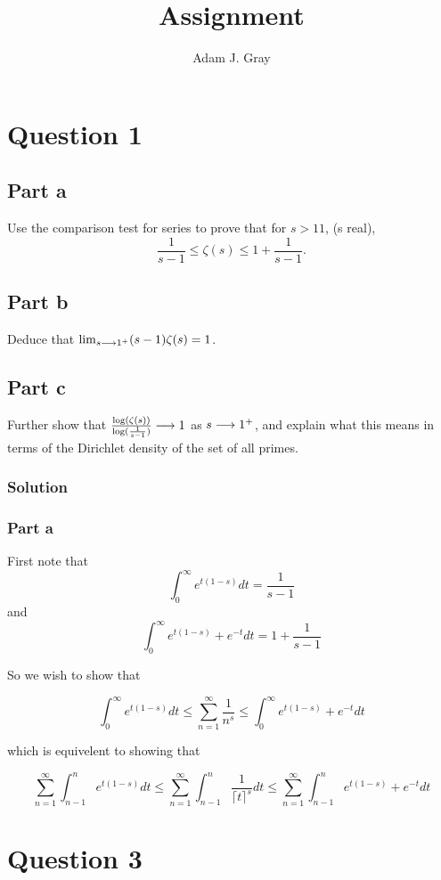 \documentclass{unswmaths}
\begin{document}
\author{Adam J. Gray}
\subject{Number Theory}
\title{Assignment}

\unswtitle

\section*{Question 1}
\subsection*{Part a}
Use the comparison test for series to prove that for  $ s > 11 $, (s real),
$$
	\frac{1}{s-1} \leq \zeta(s) \leq 1 + \frac{1}{s-1}.
$$
\subsection*{Part b}
Deduce that $ \lim_{s \longrightarrow 1^+} (s-1)\zeta(s) = 1 $.
\subsection*{Part c}
Further show that $ \frac{\log(\zeta(s))}{\log(\frac{1}{s-1})} \longrightarrow 1 $ as $ s \longrightarrow 1^+ $, and explain what this means in terms of 
the Dirichlet density of the set of all primes.

\subsubsection*{Solution}

\subsubsection*{Part a}

First note that
$$
	\int_0^\infty e^{t(1-s)} dt = \frac{1}{s-1}
$$
and
$$
	\int_0^\infty  e^{t(1-s)} + e^{-t}dt = 1 + \frac{1}{s-1}
$$

So we wish to show that 

$$
	\int_0^\infty e^{t(1-s)} dt \leq \sum_{n=1}^\infty \frac{1}{n^s} \leq \int_0^\infty  e^{t(1-s)} + e^{-t}dt
$$

which is equivelent to showing that

$$
	\sum_{n=1}^\infty \int_{n-1}^n e^{t(1-s)} dt \leq \sum_{n=1}^\infty \int_{n-1}^{n} \frac{1}{\lceil t \rceil^s} dt \leq \sum_{n=1}^\infty \int_{n-1}^n  e^{t(1-s)} + e^{-t}dt
$$

\section*{Question 3}
\end{document}
